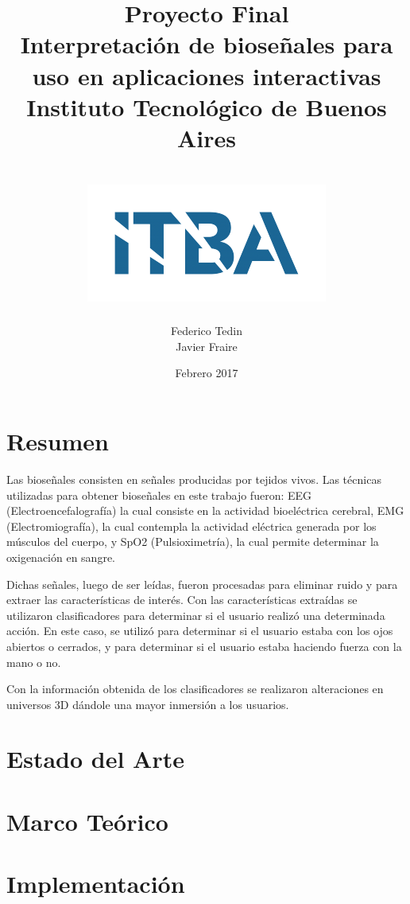 \documentclass[a4paper]{report}
\title{
	{\Huge Proyecto Final}\\
	{\Huge Interpretación de bioseñales para uso en aplicaciones interactivas}
	{\large Instituto Tecnológico de Buenos Aires}\\~\\
	{\includegraphics{itba.png}}
}
\author{{Federico Tedin} \\ {Javier Fraire}}
\date{Febrero 2017}
\begin{document}
\maketitle

\chapter*{Resumen}
\justifying
Las bioseñales consisten en señales producidas por tejidos vivos. Las técnicas utilizadas para obtener bioseñales en este trabajo fueron: EEG (Electroencefalografía) la cual consiste en la actividad bioeléctrica cerebral, EMG (Electromiografía), la cual contempla la actividad eléctrica generada por los músculos del cuerpo, y SpO2 (Pulsioximetría), la cual permite determinar la oxigenación en sangre.

Dichas señales, luego de ser leídas, fueron procesadas para eliminar ruido y para extraer las características de interés. Con las características extraídas se utilizaron clasificadores para determinar si el usuario realizó una determinada acción. En este caso, se utilizó para determinar si el usuario estaba con los ojos abiertos o cerrados, y para determinar si el usuario estaba haciendo fuerza con la mano o no.

Con la información obtenida de los clasificadores se realizaron alteraciones en universos 3D dándole una mayor inmersión a los usuarios.

\tableofcontents

\chapter{Estado del Arte}


\chapter{Marco Teórico}


\chapter{Implementación}


{}

 
\end{document}
